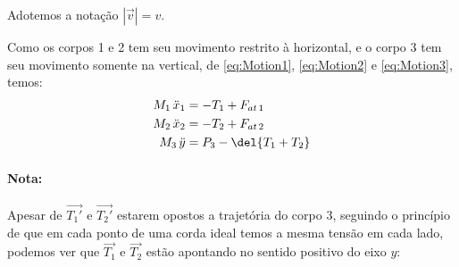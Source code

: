 \documentclass[]{IMTexam}
\begin{document}
\begin{questions}
\begin{parts}
\begin{solution}

			Adotemos a notação $ |\vec{v}|=v $.

			Como os corpos 1 e 2 tem seu movimento restrito à horizontal, e o corpo 3 tem seu movimento somente na vertical, de \ref{eq:Motion1}, \ref{eq:Motion2} e \ref{eq:Motion3}, %
			temos:
			\begin{align}
				M_1\,\ddot{x}_1 & =-T_1+F_{at\,1}\label{eq:mov1}    \\
				M_2\,\ddot{x}_2 & =-T_2+F_{at\,2}\label{eq:mov2}    \\
				M_3\,\ddot{y}   & =P_3-\del{T_1+T_2}\label{eq:mov3}
			\end{align}
			\paragraph{Nota:}
			Apesar de $ \vec{T_1'} $ e $\vec{T_2'}$ estarem opostos a trajetória do corpo 3, seguindo o princípio de que em cada ponto de uma corda ideal temos a mesma tensão em cada lado, podemos ver que $ \vec{T_1} $ e $ \vec{T_2} $ estão apontando no sentido positivo do eixo $ y $:

			\medskip

			\begin{multi}[3]
				\centering
\end{multi}
\end{solution}
\end{parts}
\end{questions}
\end{document}
